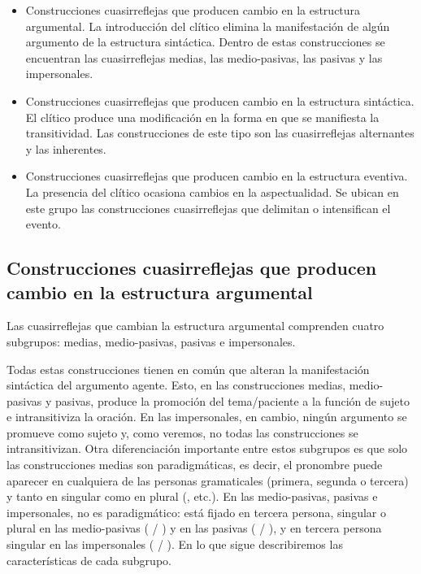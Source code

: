 \begin{itemize}
  \item Construcciones cuasirreflejas que producen cambio en la estructura
        argumental. La introducción del clítico elimina la manifestación de
        algún argumento de la estructura sintáctica. Dentro de estas
        construcciones se encuentran las cuasirreflejas medias, las
        medio-pasivas, las pasivas y las impersonales.
  \item Construcciones cuasirreflejas que producen cambio en la estructura
        sintáctica. El clítico produce una modificación en la forma en que se
        manifiesta la transitividad. Las construcciones de este tipo son las
        cuasirreflejas alternantes y las inherentes.
  \item Construcciones cuasirreflejas que producen cambio en la estructura
        eventiva. La presencia del clítico ocasiona cambios en la aspectualidad.
        Se ubican en este grupo las construcciones cuasirreflejas que delimitan
        o intensifican el evento.
\end{itemize}

\subsection{Construcciones cuasirreflejas que producen cambio en la estructura argumental}\label{sec:10-ea}

Las cuasirreflejas que cambian la estructura argumental comprenden cuatro
subgrupos: medias, medio-pasivas, pasivas e impersonales.

Todas estas construcciones tienen en común que alteran la manifestación
sintáctica del argumento agente. Esto, en las construcciones medias,
medio-pasivas y pasivas, produce la promoción del tema/paciente a la función de
sujeto e intransitiviza la oración. En las impersonales, en cambio, ningún
argumento se promueve como sujeto y, como veremos, no todas las construcciones
se intransitivizan. Otra diferenciación importante entre estos subgrupos es que
solo las construcciones medias son paradigmáticas, es decir, el pronombre puede
aparecer en cualquiera de las personas gramaticales (primera, segunda o tercera)
y tanto en singular como en plural (, etc.). En las medio-pasivas, pasivas e
impersonales,  no es paradigmático: está fijado en tercera persona,
singular o plural en las medio-pasivas (
/ ) y en las pasivas ( / ), y en tercera persona
singular en las impersonales ( /
). En lo que sigue describiremos las
características de cada subgrupo.

